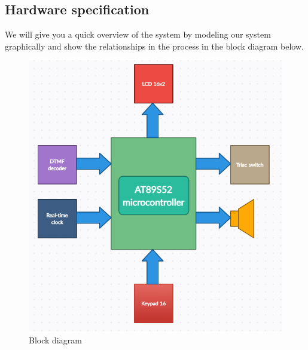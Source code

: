 \documentclass[a4paper]{article}
\begin{document}
\subsection{Hardware specification}
We will give you a quick overview of the system by modeling our system graphically and show the relationships in the process in the block diagram below.
\begin{figure}[h!]
\centering
\includegraphics[width=15cm]{images/block_diagram.PNG}
\caption*{Block diagram}
\end{figure}
\end{document}
